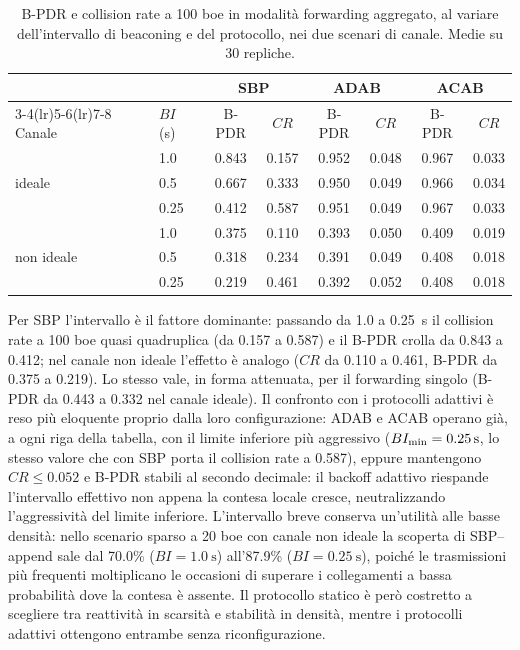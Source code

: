 \begin{table}[htbp]
  \centering
  \caption[Sensibilit\`a all'intervallo di beaconing (forwarding aggregato,
  100 boe)]{B-PDR e collision rate a 100 boe in modalit\`a forwarding
  aggregato, al variare dell'intervallo di beaconing e del protocollo, nei
  due scenari di canale. Medie su 30 repliche.}
  \label{tab:interval-summary}
  \begin{tabular}{llcccccc}
    \toprule
    & & \multicolumn{2}{c}{\textbf{SBP}} & \multicolumn{2}{c}{\textbf{ADAB}} & \multicolumn{2}{c}{\textbf{ACAB}} \\
    \cmidrule(lr){3-4}\cmidrule(lr){5-6}\cmidrule(lr){7-8}
    Canale & $BI$ (\si{\second}) & B-PDR & $CR$ & B-PDR & $CR$ & B-PDR & $CR$ \\
    \midrule
    \multirow{3}{*}{ideale}
      & 1.0  & 0.843 & 0.157 & 0.952 & 0.048 & 0.967 & 0.033 \\
      & 0.5  & 0.667 & 0.333 & 0.950 & 0.049 & 0.966 & 0.034 \\
      & 0.25 & 0.412 & 0.587 & 0.951 & 0.049 & 0.967 & 0.033 \\
    \midrule
    \multirow{3}{*}{non ideale}
      & 1.0  & 0.375 & 0.110 & 0.393 & 0.050 & 0.409 & 0.019 \\
      & 0.5  & 0.318 & 0.234 & 0.391 & 0.049 & 0.408 & 0.018 \\
      & 0.25 & 0.219 & 0.461 & 0.392 & 0.052 & 0.408 & 0.018 \\
    \bottomrule
  \end{tabular}
\end{table}

Per SBP l'intervallo \`e il fattore dominante: passando da 1.0 a
\SI{0.25}{\second} il collision rate a 100 boe quasi quadruplica (da 0.157 a
0.587) e il B-PDR crolla da 0.843 a 0.412; nel canale non ideale l'effetto
\`e analogo ($CR$ da 0.110 a 0.461, B-PDR da 0.375 a 0.219). Lo stesso vale,
in forma attenuata, per il forwarding singolo (B-PDR da 0.443 a 0.332 nel
canale ideale). Il confronto con i protocolli adattivi \`e reso pi\`u eloquente
proprio dalla loro configurazione: ADAB e ACAB operano gi\`a, a ogni riga
della tabella, con il limite inferiore pi\`u aggressivo
($BI_{\min}=\SI{0.25}{\second}$, lo stesso valore che con SBP porta il collision
rate a 0.587), eppure mantengono $CR \le 0.052$ e B-PDR stabili al secondo
decimale: il backoff adattivo riespande l'intervallo effettivo non appena la
contesa locale cresce, neutralizzando l'aggressivit\`a del limite inferiore.
L'intervallo breve conserva
un'utilit\`a alle basse densit\`a: nello scenario sparso a 20 boe con canale
non ideale la scoperta di SBP--append sale dal 70.0\% ($BI=\SI{1.0}{\second}$)
all'87.9\% ($BI=\SI{0.25}{\second}$), poich\'e le trasmissioni pi\`u frequenti
moltiplicano le occasioni di superare i collegamenti a bassa probabilit\`a
dove la contesa \`e assente. Il protocollo statico \`e per\`o costretto a
scegliere tra reattivit\`a in scarsit\`a e stabilit\`a in densit\`a, mentre i
protocolli adattivi ottengono entrambe senza riconfigurazione.

